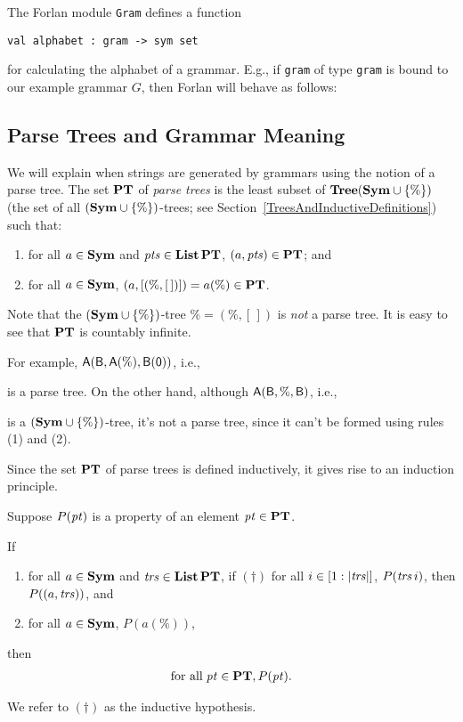 The Forlan module \texttt{Gram} defines a function
\begin{verbatim}
val alphabet : gram -> sym set
\end{verbatim}
for calculating the alphabet of a grammar.
E.g., if \texttt{gram} of type \texttt{gram} is bound to our example
grammar $G$, then Forlan will behave as follows:


\subsection{Parse Trees and Grammar Meaning}

We will explain when strings are generated by grammars using the
notion of a parse tree.  The set $\mathbf{PT}$ of \emph{parse trees} is the
least subset of $\mathbf{Tree}(\mathbf{Sym}\cup\{\%\})$ (the set of all
$(\mathbf{Sym}\cup\{\%\})$-trees; see
Section~\ref{TreesAndInductiveDefinitions}) such that:
\begin{enumerate}[\quad(1)]
\item for all $a\in\mathbf{Sym}$ and ${\it pts}\in\mathbf{List}\,\mathbf{PT}$, $(a,{\it pts})\in\mathbf{PT}$; and

\item for all $a\in\mathbf{Sym}$, $(a,[(\%,[\,])]) = a(\%)\in\mathbf{PT}$.
\end{enumerate}
Note that the $(\mathbf{Sym}\cup\{\%\})$-tree $\% = (\%,[\,])$ is
\emph{not} a parse tree.
It is easy to see that $\mathbf{PT}$ is countably infinite.

For example, $\mathsf{A}(\mathsf{B},\mathsf{A}(\%),\mathsf{B}(\mathsf{0}))$, i.e.,
\begin{center}

\end{center}
is a parse tree.  On the other hand,
although $\mathsf{A}(\mathsf{B},\%,\mathsf{B})$, i.e.,
\begin{center}

\end{center}
is a $(\mathbf{Sym}\cup\{\%\})$-tree, it's not a parse tree, since it
can't be formed using rules (1) and (2).

Since the set $\mathbf{PT}$ of parse trees is defined inductively, it gives
rise to an induction principle.

\begin{theorem}
Suppose $P({\it pt})$ is a property of an element ${\it pt}\in\mathbf{PT}$.

If
\begin{enumerate}[\quad(1)]
\item for all $a\in\mathbf{Sym}$ and ${\it trs}\in\mathbf{List}\,\mathbf{PT}$, if $(\dag)$ for all
  $i\in[1:|{\it trs}|]$, $P({\it trs}\,i)$, then $P((a,{\it trs}))$, and

\item for all $a\in\mathbf{Sym}$, $P(a(\%))$,
\end{enumerate}
then
\begin{gather*}
\allowbreak\mbox{for all}\allowbreak\;{\it pt}\in\mathbf{PT},P({\it pt}) .
\end{gather*}
\end{theorem}
We refer to $(\dag)$ as the inductive hypothesis.


